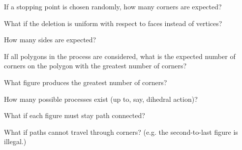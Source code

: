 \documentclass{article}
\begin{document}
\begin{question}
  If a stopping point is chosen randomly, how many corners are expected?
\end{question}
\begin{related}
  \item What if the deletion is uniform with respect to faces instead of
    vertices?
  \item How many sides are expected?
  \item If all polygons in the process are considered, what is the expected
    number of corners on the polygon with the greatest number of corners?
  \item What figure produces the greatest number of corners?
  \item How many possible processes exist (up to, say, dihedral action)?
  \item What if each figure must stay path connected?
  \item What if paths cannot travel through corners? (e.g. the second-to-last
    figure is illegal.)
\end{related}
\end{document}
